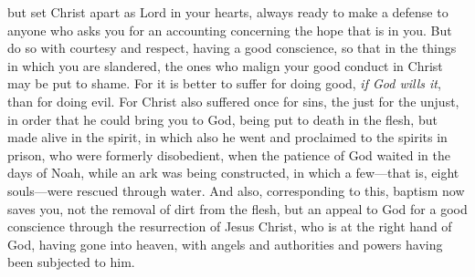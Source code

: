 \begin{biblechapter}
\verse but set Christ apart as Lord in your hearts, always ready to make a defense to anyone who asks you for an accounting concerning the hope that is in you.
\verse But do so with courtesy and respect, having a good conscience, so that in the things in which you are slandered, the ones who malign your good conduct in Christ may be put to shame.
\verse For it is better to suffer for doing good, \textit{if God wills it}, than for doing evil.
\verse For Christ also suffered once for sins, 
the just for the unjust, 
in order that he could bring you to God, 
being put to death in the flesh, 
but made alive in the spirit,
\verse in which also he went and proclaimed to the spirits in prison,
\verse who were formerly disobedient, when the patience of God waited in the days of Noah, while an ark was being constructed, in which a few—that is, eight souls—were rescued through water.
\verse And also, corresponding to this, baptism now saves you, not the removal of dirt from the flesh, but an appeal to God for a good conscience through the resurrection of Jesus Christ,
\verse who is at the right hand of God, having gone into heaven, with angels and authorities and powers having been subjected to him.
\end{biblechapter}

